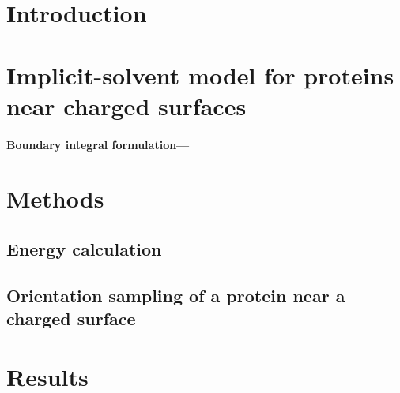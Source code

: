 \documentclass[aip,reprint]{revtex4-1}
\begin{document}

\section{Introduction}\label{sec:intro}


\section{Implicit-solvent model for proteins near charged surfaces} \label{sec:implicit_solvent}


\paragraph*{Boundary integral formulation---} \label{sec:bie}



\section{Methods}\label{sec:methods}

\subsection{Energy calculation} \label{sec:energy}


\subsection{Orientation sampling of a protein near a charged surface}  \label{sec:prot_orientation}




\section{Results} \label{sec:results}

\end{document}
